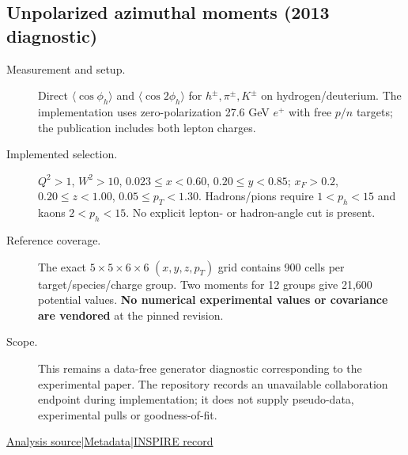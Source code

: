 \documentclass[11pt,a4paper]{article}
\newcommand{\id}[1]{{\small\texttt{\detokenize{#1}}}}
\begin{document}
\subsection{\texorpdfstring{Unpolarized azimuthal moments (2013 diagnostic)}{Unpolarized azimuthal moments (2013 diagnostic)}}
\id{HERMES_2013_I1111237}\quad\cite{r1111237}
\begin{description}
\item[Measurement and setup.] Direct $\langle\cos\phi_h\rangle$ and $\langle\cos2\phi_h\rangle$ for $h^\pm,\pi^\pm,K^\pm$ on hydrogen/deuterium. The implementation uses zero-polarization 27.6 GeV $e^+$ with free $p/n$ targets; the publication includes both lepton charges.
\item[Implemented selection.] $Q^2>1$, $W^2>10$, $0.023\le x<0.60$, $0.20\le y<0.85$; $x_F>0.2$, $0.20\le z<1.00$, $0.05\le p_T<1.30$. Hadrons/pions require $1<p_h<15$ and kaons $2<p_h<15$. No explicit lepton- or hadron-angle cut is present.
\item[Reference coverage.] The exact $5\times5\times6\times6$ $(x,y,z,p_T)$ grid contains 900 cells per target/species/charge group. Two moments for 12 groups give 21,600 potential values. \textbf{No numerical experimental values or covariance are vendored} at the pinned revision.
\item[Scope.] This remains a data-free generator diagnostic corresponding to the experimental paper. The repository records an unavailable collaboration endpoint during implementation; it does not supply pseudo-data, experimental pulls or goodness-of-fit.
\end{description}
{\small\href{https://github.com/apapaefs/HerwigPolarizedPheno/blob/105045bd757aaa6b217e87811dc5f9a22a8d1cef/analyses/rivet/dis/HERMES_2013_I1111237.cc}{Analysis source}\quad|\quad\href{https://github.com/apapaefs/HerwigPolarizedPheno/blob/105045bd757aaa6b217e87811dc5f9a22a8d1cef/analyses/rivet/dis/HERMES_2013_I1111237.info}{Metadata}\quad|\quad\href{https://inspirehep.net/literature/1111237}{INSPIRE record}}
\end{document}
